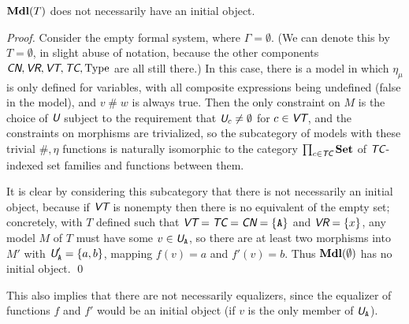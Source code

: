 \documentclass[runningheads,a4paper]{llncs}
\newcommand{\cn}{\textit{\textsf{CN}}} %
\newcommand{\vr}{\textit{\textsf{VR}}} %
\newcommand{\tc}{\textit{\textsf{TC}}} %
\newcommand{\vt}{\textit{\textsf{VT}}} %
\newcommand{\uv}{\textit{\textsf{U}}} %
\newcommand{\type}{{\rm Type}}
\newcommand{\fresh}{\mathbin{\#}}
\begin{document}
\begin{theorem}\label{thm:noinit}
${\bf Mdl}(T)$ does not necessarily have an initial object.
\end{theorem}
\begin{proof}
Consider the empty formal system, where $\Gamma=\emptyset$. (We can denote this by $T=\emptyset$, in slight abuse of notation, because the other components $\cn,\vr,\vt,\tc,\type$ are all still there.) In this case, there is a model in which $\eta_\mu$ is only defined for variables, with all composite expressions being undefined (false in the model), and $v\fresh w$ is always true. Then the only constraint on $M$ is the choice of $\uv$ subject to the requirement that $\uv_c\ne\emptyset$ for $c\in\vt$, and the constraints on morphisms are trivialized, so the subcategory of models with these trivial $\fresh,\eta$ functions is naturally isomorphic to the category $\prod_{c\in\tc}{\bf Set}$ of $\tc$-indexed set families and functions between them.

It is clear by considering this subcategory that there is not necessarily an initial object, because if $\vt$ is nonempty then there is no equivalent of the empty set; concretely, with $T$ defined such that $\vt=\tc=\cn=\{\texttt{A}\}$ and $\vr=\{x\}$, any model $M$ of $T$ must have some $v\in\uv_\texttt{A}$, so there are at least two morphisms into $M'$ with $\uv'_\texttt{A}=\{a,b\}$, mapping $f(v)=a$ and $f'(v)=b$. Thus ${\bf Mdl}(\emptyset)$ has no initial object.
\qed\end{proof}

This also implies that there are not necessarily equalizers, since the equalizer of functions $f$ and $f'$ would be an initial object (if $v$ is the only member of $\uv_\texttt{A}$).
\end{document}
